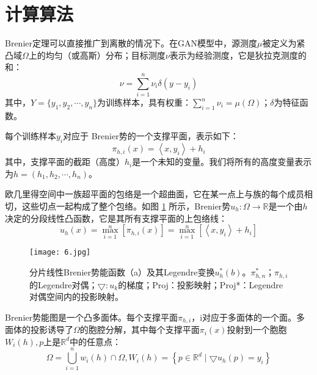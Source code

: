 
\section{计算算法}

 Brenier定理可以直接推广到离散的情况下。在GAN模型中，源测度$\mu$被定义为紧凸域$\Omega$上的均匀（或高斯）分布；目标测度$\nu$表示为经验测度，它是狄拉克测度的和：
\begin{equation}
	\nu = \sum_{i=1}^{n} \nu _i \delta (y-y_i)
	\label{function:17}
\end{equation}
其中，$Y=\{ y_1, y_2, \cdots, y_n \}$为训练样本，具有权重：$\sum_{i=1}^{n} \nu _i=\mu(\Omega)$；$\delta$为特征函数。

每个训练样本$y_i$对应于 Brenier势的一个支撑平面，表示如下：
\begin{equation}
	\pi _{h,i} (x) =\left \langle x , y_i \right \rangle +h_i 
	\label{function:18}
\end{equation}
其中，支撑平面的截距（高度）$h_i$是一个未知的变量。我们将所有的高度变量表示为$h=(h_1,h_2,\cdots ,h_n)$。

欧几里得空间中一族超平面的包络是一个超曲面，它在某一点上与族的每个成员相切，这些切点一起构成了整个包络。如图 \ref{fig:6} 所示，Brenier势$u_h : \Omega \to \mathbb{R}$是一个由$h$决定的分段线性凸函数，它是其所有支撑平面的上包络线：
\begin{equation}
	u_h(x)=\max_{i=1}^{n}\left [ \pi _{h,i}(x) \right ] =\max_{i=1}^{n}\left [ \left \langle x,y_i \right \rangle +h_i \right ]
	\label{function:19}
\end{equation}

\begin{figure}[h]
	\centering
	\texttt{[image: 6.jpg]}
	\caption{分片线性Brenier势能函数（a）及其Legendre变换$u_h^*(b)$。$\pi_{h,n}^*$；$\pi_{h,i}$的Legendre对偶；$\bigtriangledown  : u_k$的梯度；Proj：投影映射；Proj*：Legendre对偶空间内的投影映射。}
	\label{fig:6}
\end{figure}

Brenier势能图是一个凸多面体。每个支撑平面$\pi_{h,i}$，i对应于多面体的一个面。多面体的投影诱导了$\Omega$的胞腔分解，其中每个支撑平面$\pi _i(x)$投射到一个胞胞$W_i(h),p$上是$\mathbb{R}^d$中的任意点：
\begin{equation}
	\Omega=\bigcup_{i=1}^{n} w_i(h) \cap \Omega, W_i(h)=\left \{ p \in \mathbb{R}^d \mid \bigtriangledown  u_h(p)=y_i \right \}  
	\label{function:20}
\end{equation}

